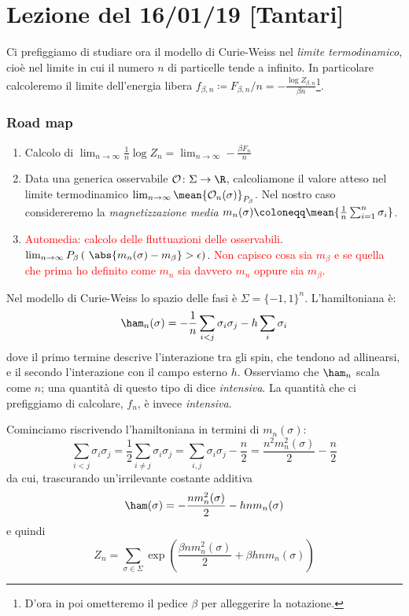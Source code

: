 \section{Lezione del 16/01/19 [Tantari]}

Ci prefiggiamo di studiare ora il modello di Curie-Weiss nel \emph{limite termodinamico}, cioè nel limite in cui il numero $ n $ di particelle tende a infinito. In particolare calcoleremo il limite dell'energia libera $ f_{\beta, n} \coloneqq F_{\beta, n}/n = -\frac{\log Z_{\beta, n}}{\beta n}$\footnote{D'ora in poi ometteremo il pedice $ \beta $ per alleggerire la notazione.}.

\subsubsection{Road map}
\begin{enumerate}
  \item Calcolo di $ \lim_{n\to\infty} \frac{1}{n} \log{Z_n} = \lim_{n\to\infty} -\frac{\beta F_n}{n} $
  \item Data una generica osservabile $ \mathcal{O}\colon\Sigma\to\R $, calcoliamone il valore atteso nel limite termodinamico $ \lim_{n\to\infty} \mean{\mathcal{O}_n(\sigma)}_{P_\beta} $. Nel nostro caso considereremo la \emph{magnetizzazione media} $ m_n(\sigma) \coloneqq \mean{\frac{1}{n}\sum_{i=1}^{n}\sigma_i} $.
  \item \textcolor{red}{Automedia: calcolo delle fluttuazioni delle osservabili}.
  $ \lim_{n\to\infty} P_\beta\left(\ \abs{m_n(\sigma) - m_\beta } > \epsilon \right) $.
  \textcolor{red}{Non capisco cosa sia $ m_\beta $ e se quella che prima ho definito come $ m_n $ sia davvero $ m_n $ oppure sia $ m_\beta $.}
\end{enumerate}

Nel modello di Curie-Weiss lo spazio delle fasi è $ \Sigma = \{-1,1\}^n $. L'hamiltoniana è:
\[ \ham_n(\sigma) = -\frac{1}{n} \sum_{i<j} \sigma_i \sigma_j - h \sum_i \sigma_i \]
dove il primo termine descrive l'interazione tra gli spin, che tendono ad allinearsi, e il secondo l'interazione con il campo esterno $ h $. Osserviamo che $ \ham_n $ scala come $ n $; una quantità di questo tipo di dice \emph{intensiva}. La quantità che ci prefiggiamo di calcolare, $ f_n $, è invece \emph{intensiva}.

Cominciamo riscrivendo l'hamiltoniana in termini di $ m_n(\sigma) $:
\[ \sum_{i<j} \sigma_i \sigma_j = \frac{1}{2} \sum_{i \neq j} \sigma_i \sigma_j = \sum_{i,j} \sigma_i \sigma_j -\frac{n}{2} = \frac{n^2 m_n^2(\sigma)}{2} - \frac{n}{2} \]
da cui, trascurando un'irrilevante costante additiva
\[ \ham(\sigma) = -\frac{n m_n^2(\sigma)}{2} - hnm_n(\sigma) \]
e quindi
\[ Z_n = \sum_{\sigma \in \Sigma} \exp\left( \frac{\beta n m_n^2(\sigma)}{2} + \beta h n m_n(\sigma) \right) \]

